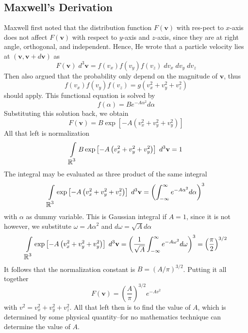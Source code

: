 \documentclass[../../../Main.tex]{subfiles}
\begin{document}
\subsection{Maxwell's Derivation}
Maxwell first noted that the distribution function $F(\mathbf{v})$ with res-pect to $x$-axis does not affect $F(\mathbf{v})$ with respect to $y$-axis and $z$-axis, since they are at right angle, orthogonal, and independent. Hence, He wrote that a particle velocity lies at $(\mathbf{v}, \mathbf{v}+d\mathbf{v})$ as 
\begin{equation*}
    F(\mathbf{v})\;d^3\mathbf{v}=f(v_x)f(v_y)f(v_z)\;dv_x\;dv_y\;dv_z
\end{equation*}
Then also argued that the probability only depend on the magnitude of $\mathbf{v}$, thus
\begin{equation*}
    f(v_x)f(v_y)f(v_z)= g(v_x^2+v_y^2+v_z^2)
\end{equation*}
should apply. This functional equation is solved by
\begin{equation*}
    f(\alpha)=Be^{-A\alpha^2}d\alpha
\end{equation*}
Substituting this solution back, we obtain 
\begin{equation*}
    F(\mathbf{v})=B \exp \left[-A\left(v_x^2+v_y^2+v_y^2\right)\right]
\end{equation*}
All that left is normalization
\begin{equation*}
    \int\displaylimits_{\displaystyle\mathbb{R}^3} B \exp \left[-A\left(v_x^2+v_y^2+v_y^2\right)\right]\; d^3\mathbf{v}=1
\end{equation*}
The integral may be evaluated as three product of the same integral
\begin{equation*}
    \int\displaylimits_{\displaystyle\mathbb{R}^3} \exp \left[-A\left(v_x^2+v_y^2+v_z^2\right)\right]\; d^3\mathbf{v} = \left(\int_{-\infty}^{\infty}e^{-A\alpha^2}d\alpha \right)^3
\end{equation*}
with $\alpha$ as dummy variable. This is Gaussian integral if $A=1$, since it is not however, we substitute $\omega=A\alpha^2$ and $d\omega=\sqrt{A}d\alpha$
\begin{equation*}
    \int\displaylimits_{\displaystyle\mathbb{R}^3} \exp \left[-A\left(v_x^2+v_y^2+v_y^2\right)\right]\; d^3\mathbf{v} = \left(\frac{1}{\sqrt{A}}\int_{-\infty}^{\infty}e^{-A\omega^2}d\omega\right)^3=\left(\frac{\pi}{2}\right)^{3/2}
\end{equation*}
It follows that the normalization constant is $B=(A/\pi)^{3/2}$. Putting it all together
\begin{equation*}
    F(\mathbf{v})= \left(\frac{A}{\pi}\right)^{3/2}e^{-Av^2}
\end{equation*}
with $v^2=v_x^2+v_y^2+v_z^2$. All that left then is to find the value of $A$, which is determined by some physical quantity--for no mathematics technique can determine the value of $A$.
\end{document}
